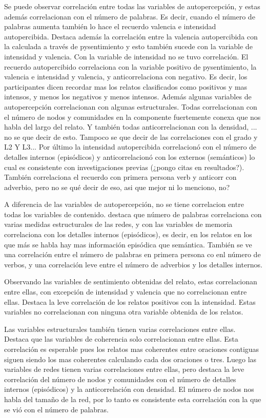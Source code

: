 Se puede observar correlación entre todas las variables de autopercepción, y estas además correlacionan con el número de palabras. Es decir, cuando el número de palabras aumenta también lo hace el recuerdo valencia e intensidad autopercibida. Destaca además la correlación entre la valencia autopercibida con la calculada a través de pysentimiento y esto también sucede con la variable de intensidad y valencia. Con la variable de intensidad no se tuvo correlación.
El recuerdo autopercibido correlaciona con la variable positivo de pysentimiento, la valencia e intensidad y valencia, y anticorrelaciona con negativo. Es decir, los participantes dicen recordar mas los relatos clasificados como positivos y mas intensos, y menos los negativos y menos intensos. 
Además algunas variables de autopercepción correlacionan con algunas estructurales. Todas correlacionan con el número de nodos y comunidades en la componente fuertemente conexa que nos habla del largo del relato. Y también todas anticorrelacionan con la densidad, ... no se que decir de esto. Tampoco se que decir de las correlaciones con el grado y L2 Y L3...
Por último la intensidad autopercibida correlacionó con el número de detalles internos (episódicos) y anticorrelacionó con los externos (semánticos) lo cual es consistente con investigaciones previas (¿pongo citas en resultados?).
También correlaciona el recuerdo con primera persona verb y anticorr con adverbio, pero no se qué decir de eso, asi que mejor ni lo menciono, no?

A diferencia de las variables de autopercepción, no se tiene correlacion entre todas los variables de contenido. destaca que número de palabras correlaciona con varias medidas estructurales de las redes, y con las variables de memoria correlaciona con los detalles internos (episódicos), es decir, en los relatos en los que más se habla hay mas información episódica que semántica. También se ve una correlación entre el número de palabras en primera persona co enl número de verbos, y una correlación leve entre el número de adverbios y los detalles internos.

Observando las variables de sentimiento obtenidas del relato, estas correlacionan entre ellas, con excepción de intensidad y valencia que no correlacionan entre ellas. Destaca la leve correlación de los relatos positivos con la intensidad. Estas variables no correlacionan con ninguna otra variable obtenida de los relatos.

Las variables estructurales también tienen varias correlaciones entre ellas. Destaca que las variables de coherencia solo correlacionan entre ellas. Esta correlación es esperable pues los relatos mas coherentes entre oraciones contiguas siguen siendo los mas coherentes calculando cada dos oraciones o tres. Luego las variables de redes tienen varias correlaciones entre ellas, pero destaca la leve correlación del número de nodos y comunidades con el número de detalles internos (episódicos) y la anticorrelación con densidad. El número de nodos nos habla del tamaño de la red, por lo tanto es consistente esta correlación con la que se vió con el número de palabras.

